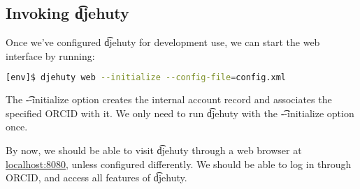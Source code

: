 \subsection{Invoking \t{djehuty}}

Once we've configured \t{djehuty} for development use, we can start the web
interface by running:

\begin{lstlisting}[language=bash]
[env]$ djehuty web --initialize --config-file=config.xml
\end{lstlisting}

The \t{-{}-initialize} option creates the internal account record and
associates the specified ORCID with it.  We only need to run \t{djehuty}
with the \t{-{}-initialize} option once.

By now, we should be able to visit \t{djehuty} through a web browser at
\href{http://127.0.0.1:8080}{localhost:8080}, unless configured differently.
We should be able to log in through ORCID, and access all features of
\t{djehuty}.
